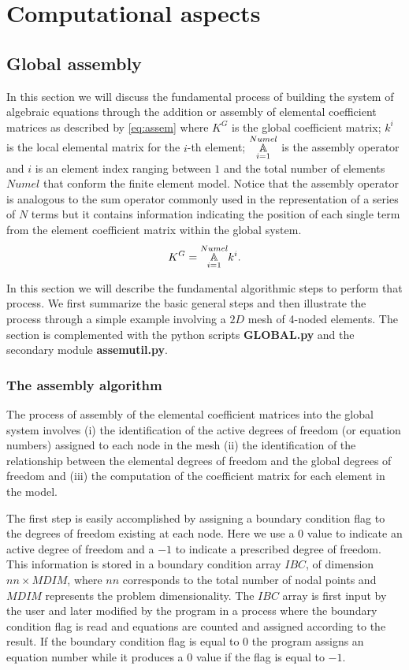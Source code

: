 %
\graphicspath{ {./img/COMPU/} }
\chapter{Computational aspects}
\label{chap: Computational Aspects}
\section{Global assembly}
In this section we will discuss the fundamental process of building the system of algebraic equations through the addition or assembly of elemental coefficient matrices as described by \cref{eq:assem} where $K^G$ is the global coefficient matrix; $k^i$ is the local elemental matrix for the $i$-th element; $\assem{i=1}{Numel}$ is the assembly operator and $i$ is an element index ranging between $1$ and the total number of elements $Numel$ that conform the finite element model. Notice that the assembly operator is analogous to the sum operator commonly used in the representation of a series of $N$ terms but it contains information indicating the position of each single term from the element coefficient matrix within the global system.
\begin{equation}\label{eq:assem}
{K^G}=\assem{i=1}{Numel} k^i.
\end{equation}

In this section we will describe the fundamental algorithmic steps to perform that process. We first summarize the basic general steps and then illustrate the process through a simple example involving a $2D$ mesh of 4-noded elements. The section is complemented with the python scripts {\bf GLOBAL.py} and the secondary module {\bf assemutil.py}.

\subsection*{The assembly algorithm}
The process of assembly of the elemental coefficient matrices into the global system involves (i) the identification of the active degrees of freedom (or equation numbers) assigned to each node in the mesh (ii) the identification of the relationship between the elemental degrees of freedom and the global degrees of freedom and (iii) the computation of the coefficient matrix for each element in the model.

The first step is easily accomplished by assigning a boundary condition flag to the degrees of freedom existing at each node. Here we use a $0$ value to indicate an active degree of freedom and a $-1$ to indicate a prescribed degree of freedom. This information is stored in a boundary condition array $IBC$, of dimension $nn \times MDIM$, where $nn$ corresponds to the  total number of nodal points and $MDIM$ represents the problem dimensionality. The $IBC$ array is first input by the user and later modified by the program in a process where the boundary condition flag is read and equations are counted and assigned according to the result. If the boundary condition flag is equal to $0$ the program assigns an equation number while it produces a $0$ value if the flag is equal to $-1$.

